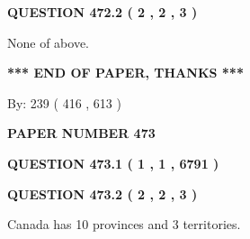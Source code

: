 \documentclass[12pt]{article}
\begin{document}
\vspace{0.2in}
  
{\textbf{\Large{QUESTION
472.2 
 ( 2 , 2 , 3 )
}}}
  
  
 
 
\noindent{}
 
 
 None of above.
 
 
 
 
   
   
 \vspace{0.2in}
 
   
   
   
   
\vspace{1.0in} 
{\textbf{\large{ *** END OF PAPER, THANKS *** }}} 
   
   
\hspace{1.0in} By: 
 239 ( 416 ,  613 )
   
   
   
   
\newpage 
\setcounter{page}{ 
   473001 } 
   
   
   
   
 {\textbf{ \Large{ PAPER NUMBER  473  }}}
   
   
\vspace{0.2in}
   
   
   
   
   
   
 \vspace{0.2in}
 
 
 
 
   
   
  
\vspace{0.2in}
  
{\textbf{\Large{QUESTION
473.1 
 ( 1 , 1 , 6791 )
}}}
  
  
  
\vspace{0.2in}
  
{\textbf{\Large{QUESTION
473.2 
 ( 2 , 2 , 3 )
}}}
  
  
 
 
\noindent{}
 
 
Canada has 10  provinces and 3 territories.
 
\end{document}
